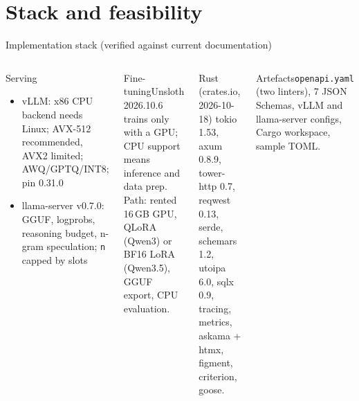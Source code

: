 \documentclass[aspectratio=169,10pt]{beamer}
\begin{document}
\section{Stack and feasibility}
\begin{frame}{Implementation stack (verified against current documentation)}
\scriptsize
\begin{columns}[T]
\begin{block}{Serving}
\begin{itemize}\item vLLM: x86 CPU backend needs Linux; AVX-512 recommended, AVX2 limited; AWQ/GPTQ/INT8; pin 0.31.0\item llama-server v0.7.0: GGUF, logprobs, reasoning budget, n-gram speculation; \texttt{n} capped by slots\end{itemize}
\end{block}
\begin{block}{Fine-tuning}Unsloth 2026.10.6 trains only with a GPU; CPU support means inference and data prep. Path: rented 16\,GB GPU, QLoRA (Qwen3) or BF16 LoRA (Qwen3.5), GGUF export, CPU evaluation.\end{block}
\begin{block}{Rust (crates.io, 2026-10-18)}
tokio 1.53, axum 0.8.9, tower-http 0.7, reqwest 0.13, serde, schemars 1.2, utoipa 6.0, sqlx 0.9, tracing, metrics, askama + htmx, figment, criterion, goose.
\end{block}
\begin{exampleblock}{Artefacts}\texttt{openapi.yaml} (two linters), 7 JSON Schemas, vLLM and llama-server configs, Cargo workspace, sample TOML.\end{exampleblock}
\end{columns}
\end{frame}
\end{document}
